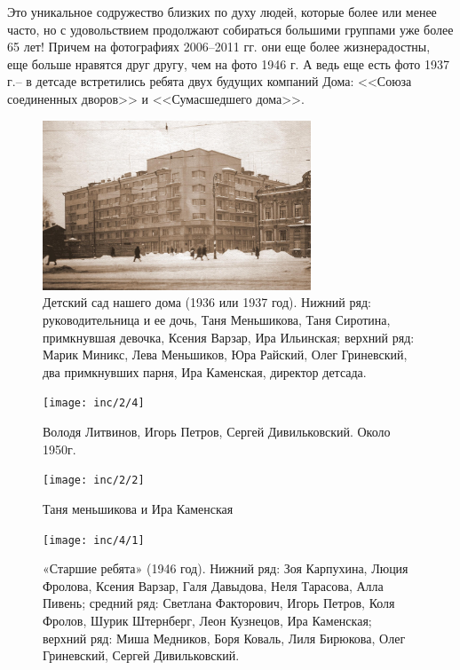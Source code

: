 Это уникальное содружество близких по духу людей, которые более или менее часто, но с удовольствием продолжают собираться большими группами уже более 65 лет! Причем на фотографиях 2006--2011 гг. они еще более жизнерадостны, еще больше нравятся друг другу, чем на фото 1946 г. А ведь еще есть фото 1937 г.-- в детсаде встретились ребята двух будущих компаний Дома: <<Союза соединенных дворов>> и <<Сумасшедшего дома>>.

\newpage


\singlespacing

\thispagestyle{empty} 
\begin{figure}
    \includegraphics[width=80mm]{inc/2/1}
    \caption{Детский сад нашего дома (1936 или 1937 год). Нижний ряд: руководительница и ее дочь, Таня Меньшикова, Таня Сиротина, примкнувшая девочка, Ксения Варзар, Ира Ильинская; верхний ряд: Марик Миникс, Лева Меньшиков, Юра Райский, Олег Гриневский, два примкнувших парня, Ира Каменская, директор детсада.
}
\end{figure}

\begin{figure}
    \begin{minipage}[h!]{49mm}
        \texttt{[image: inc/2/4]}
        \begin{footnotesize}Володя Литвинов, Игорь Петров, Сергей Дивильковский. Около 1950г.\end{footnotesize}
    \end{minipage}
    \hspace{5pt}
    \begin{minipage}[h!]{25mm}
        \texttt{[image: inc/2/2]}
        \begin{footnotesize}Таня меньшикова и Ира Каменская\end{footnotesize}
    \end{minipage}
\end{figure}

\begin{figure}[h!]
    \texttt{[image: inc/4/1]}
    \caption{«Старшие ребята» (1946 год). Нижний ряд: Зоя Карпухина, Люция Фролова, Ксения Варзар, Галя Давыдова, Неля Тарасова, Алла Пивень; средний ряд: Светлана Факторович, Игорь Петров, Коля Фролов, Шурик Штернберг, Леон Кузнецов, Ира Каменская; верхний ряд: Миша Медников, Боря Коваль, Лиля Бирюкова, Олег Гриневский, Сергей Дивильковский. }
\end{figure}

